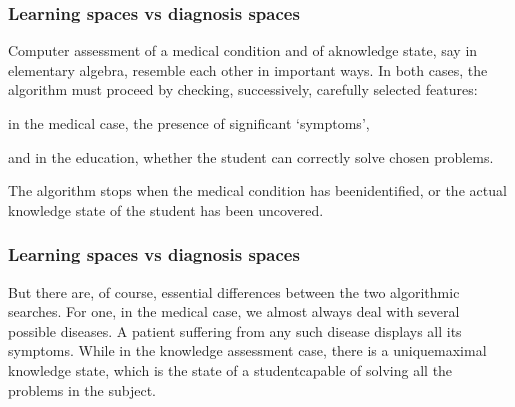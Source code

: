 \documentclass{beamer}
\def\tl{\vskip 2mm}
\def\itbul{\item[$\bullet$]}
\begin{document}
   \begin{frame}
\frametitle{Learning spaces vs diagnosis spaces} 
\center
\begin{minipage}{9.8 cm}  Computer assessment of a medical condition and of a\linebreak knowledge state, say in elementary algebra, resemble each other in important ways. 
In both cases, the algorithm must proceed by checking, successively, carefully selected features: 
\vspace{-.4cm}

\begin{roster}
\itbul in the medical case, the presence of significant `symptoms',
\itbul and in the education, whether the student  can correctly solve chosen problems. 
\end{roster}
The algorithm stops when the medical condition has been\linebreak identified, or the actual knowledge state of the student has been uncovered.  
\end{minipage}
\vspace{1cm}

\end{frame} 
   \begin{frame}
\frametitle{Learning spaces vs diagnosis spaces} 
\center
\begin{minipage}{10 cm}  But there are, of course, essential differences between the two algorithmic searches.
\tl
For one, in the medical case, we almost always deal with several possible diseases.
 A patient suffering from any such disease displays all its symptoms. 
\tl
While in the knowledge assessment case,  there is a unique\linebreak maximal knowledge  state, which is the state of a student\linebreak capable of solving all the problems in the subject.
 \end{minipage}
 \vspace{1cm}

 \end{frame}
\end{document}
